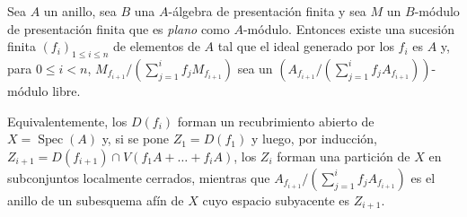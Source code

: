 \begin{proposition}[11.3.15]
\label{IV.11.3.15}
Sea $A$ un anillo, sea $B$ una $A$-álgebra de presentación finita y sea $M$ un $B$-módulo de presentación finita que es \emph{plano} como $A$-módulo. Entonces existe una sucesión finita $(f_i)_{1\leq i\leq n}$ de elementos de $A$ tal que el ideal generado por los $f_i$ es $A$ y, para $0\leq i<n$,
$M_{f_{i+1}}/(\sum_{j=1}^{i}f_jM_{f_{i+1}})$
sea un
$(A_{f_{i+1}}\big/(\sum_{j=1}^{i}f_jA_{f_{i+1}}))$-módulo libre.
\end{proposition}

Equivalentemente, los $D(f_i)$ forman un recubrimiento abierto de $X=\operatorname{Spec}(A)$ y, si se pone $Z_1=D(f_1)$ y luego, por inducción,
$Z_{i+1}=D(f_{i+1})\cap V(f_1A+\ldots+f_iA)$,
los $Z_i$ forman una partición de $X$ en subconjuntos localmente cerrados, mientras que
$A_{f_{i+1}}/(\sum_{j=1}^{i}f_jA_{f_{i+1}})$
es el anillo de un subesquema afín de $X$ cuyo espacio subyacente es $Z_{i+1}$.

